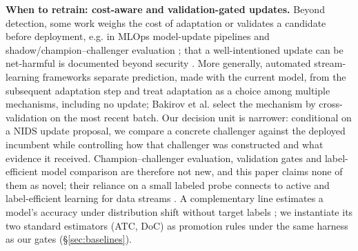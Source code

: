 \documentclass[a4paper,fleqn]{cas-sc}
\begin{document}
\textbf{When to retrain: cost-aware and validation-gated updates.} Beyond detection, some work weighs the cost of adaptation or validates a candidate before deployment, e.g. in MLOps model-update pipelines and shadow/champion--challenger evaluation \cite{nath2007champion,sculley2015hidden,kreuzberger2023mlops,guissouma2023continuous}; that a well-intentioned update can be net-harmful is documented beyond security \cite{bansal2019updates}. More generally, automated stream-learning frameworks separate prediction, made with the current model, from the subsequent adaptation step and treat adaptation as a choice among multiple mechanisms, including no update; Bakirov et al. \cite{bakirov2021automated} select the mechanism by cross-validation on the most recent batch. Our decision unit is narrower: conditional on a NIDS update proposal, we compare a concrete challenger against the deployed incumbent while controlling how that challenger was constructed and what evidence it received. Champion--challenger evaluation, validation gates and label-efficient model comparison are therefore not new, and this paper claims none of them as novel; their reliance on a small labeled probe connects to active and label-efficient learning for data streams \cite{cacciarelli2024active,krawczyk2019adaptive,liu2021comprehensive}. A complementary line estimates a model's accuracy under distribution shift without target labels \cite{garg2022atc,guillory2021doc,deng2021labels,baek2022agreement,jiang2022disagreement,rosenfeld2023dis2}; we instantiate its two standard estimators (ATC, DoC) as promotion rules under the same harness as our gates (\S\ref{sec:baselines}).
\end{document}

